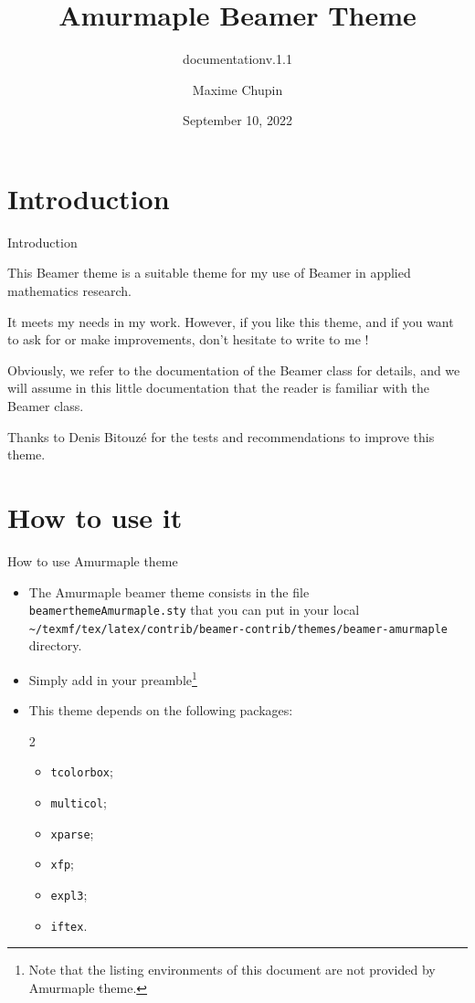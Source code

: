 \documentclass[10pt,aspectratio=169,english]{beamer}
\title[Amurmaple documentation]{Amurmaple Beamer Theme}
\author[M.~Chupin]{Maxime Chupin}
\subtitle{documentation\quad v.1.1}
\institute[CNRS]{CNRS\\
University of Paris-Dauphine}
\date{September 10, 2022}
\begin{document}
\maketitle

\sepframe[title={Table of contents}]
\section{Introduction}

\begin{frame}{Introduction}
\begin{information}
This Beamer theme is  a suitable theme for my use of Beamer in applied
mathematics research.

It meets my needs in my work. However, if you like this theme, and if you want
to ask for or make improvements, don't hesitate to write to me !

Obviously, we refer to the documentation of the Beamer class for details, and we
will assume in this little documentation that the reader is familiar with the
Beamer class.
\end{information}
Thanks to Denis Bitouzé for the tests and recommendations to improve this
theme.
\end{frame}


\section{How to use it}

\sepframe

\begin{frame}[fragile]{How to use Amurmaple theme}
  \begin{itemize}
  \item The Amurmaple beamer theme consists in the file
    \texttt{beamerthemeAmurmaple.sty} that you can put in your local
    \texttt{\~{}/texmf/tex/latex/contrib/beamer-contrib/themes/beamer-amurmaple}
    directory.
  \item Simply add in your preamble\footnote{Note that the listing environments
      of this document are not provided by Amurmaple theme.}
\item This theme depends on the following packages:
  \begin{multicols}{2}
  \begin{itemize}
  \item \lstinline+tcolorbox+;
  \item \lstinline+multicol+;
  \item \lstinline+xparse+;
  \item \lstinline+xfp+;
  \item \lstinline+expl3+;
  \item \lstinline+iftex+.
  \end{itemize}
\end{multicols}
\end{itemize}
\end{frame}
\end{document}
